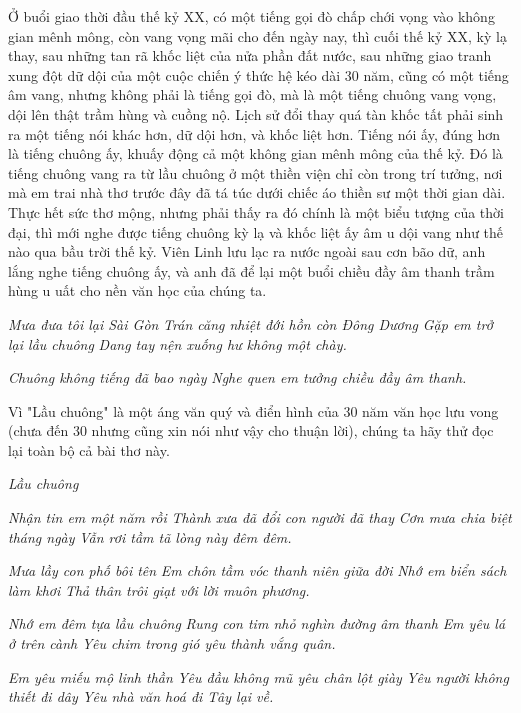 \documentclass[../main.tex]{subfiles}
\begin{document}
\begin{multicols}{2}
Ở buổi giao thời đầu thế kỷ XX, có một tiếng gọi đò chấp chới vọng vào không gian mênh mông, còn vang vọng mãi cho đến ngày nay, thì cuối thế kỷ XX, kỳ lạ thay, sau những tan rã khốc liệt của nửa phần đất nước, sau những giao tranh xung đột dữ dội của một cuộc chiến ý thức hệ kéo dài 30 năm, cũng có một tiếng âm vang, nhưng không phải là tiếng gọi đò, mà là một tiếng chuông vang vọng, dội lên thật trầm hùng và cuồng nộ. Lịch sử đổi thay quá tàn khốc tất phải sinh ra một tiếng nói khác hơn, dữ dội hơn, và khốc liệt hơn. Tiếng nói ấy, đúng hơn là tiếng chuông ấy, khuấy động cả một không gian mênh mông của thế kỷ. Đó là tiếng chuông vang ra từ lầu chuông ở một thiền viện chỉ còn trong trí tưởng, nơi mà em trai nhà thơ trước đây đã tá túc dưới chiếc áo thiền sư một thời gian dài. Thực hết sức thơ mộng, nhưng phải thấy ra đó chính là một biểu tượng của thời đại, thì mới nghe được tiếng chuông kỳ lạ và khốc liệt ấy âm u dội vang như thế nào qua bầu trời thế kỷ. Viên Linh lưu lạc ra nước ngoài sau cơn bão dữ, anh lắng nghe tiếng chuông ấy, và anh đã để lại một buổi chiều đầy âm thanh trầm hùng u uất cho nền văn học của chúng ta. 
 
\textit{Mưa đưa tôi lại Sài Gòn} 
\textit{Trán căng nhiệt đới hồn còn Đông Dương} 
\textit{Gặp em trở lại lầu chuông} 
\textit{Dang tay nện xuống hư không một chày.} 
 
\textit{Chuông không tiếng đã bao ngày} 
\textit{Nghe quen em tưởng chiều đầy âm thanh.} 
 
Vì "Lầu chuông" là một áng văn quý và điển hình của 30 năm văn học lưu vong (chưa đến 30 nhưng cũng xin nói như vậy cho thuận lời), chúng ta hãy thử đọc lại toàn bộ cả bài thơ này. 
 
\textit{Lầu chuông} 
 
\textit{Nhận tin em một năm rồi} 
\textit{Thành xưa đã đổi con người đã thay} 
\textit{Cơn mưa chia biệt tháng ngày} 
\textit{Vẫn rơi tầm tã lòng này đêm đêm.} 
 
\textit{Mưa lầy con phố bôi tên} 
\textit{Em chôn tầm vóc thanh niên giữa đời} 
\textit{Nhớ em biển sách làm khơi} 
\textit{Thả thân trôi giạt với lời muôn phương.} 
 
\textit{Nhớ em đêm tựa lầu chuông} 
\textit{Rung con tim nhỏ nghìn đường âm thanh} 
\textit{Em yêu lá ở trên cành} 
\textit{Yêu chim trong gió yêu thành vắng quân.} 
 
\textit{Em yêu miếu mộ linh thần} 
\textit{Yêu đầu không mũ yêu chân lột giày} 
\textit{Yêu người không thiết đi dây} 
\textit{Yêu nhà văn hoá đi Tây lại về.} 
 

\end{multicols}
\end{document}
